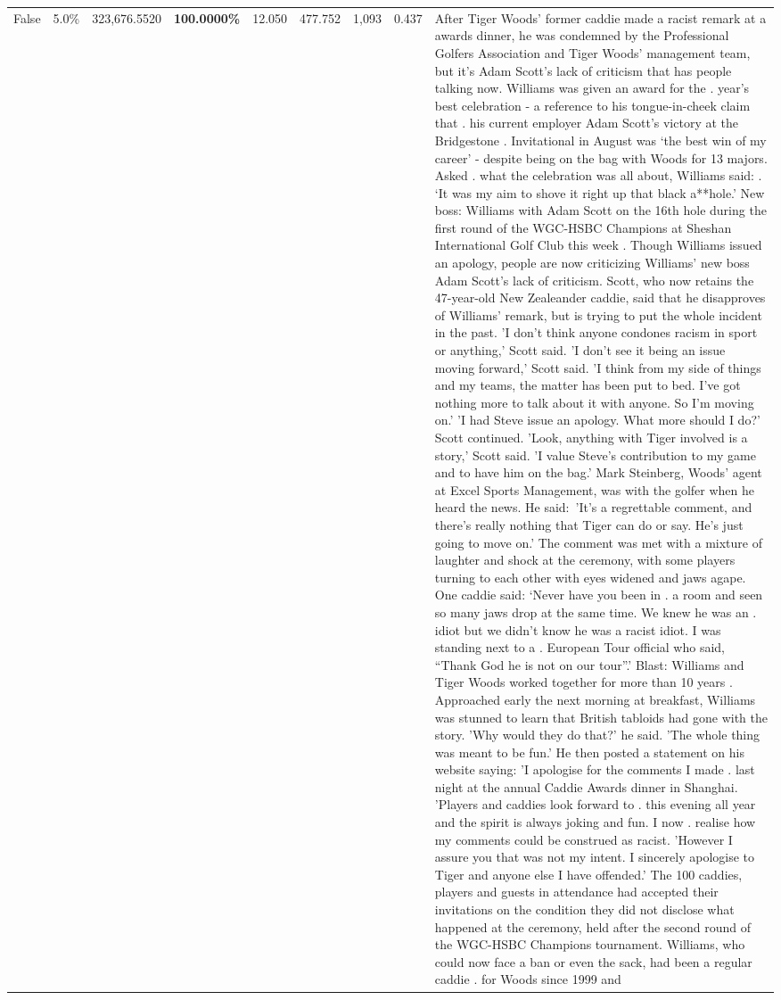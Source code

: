 \begin{table}[H]
\begin{tabular}{lllrlllll}
False & 5.0\% & 323,676.5520 & \bfseries \color{red} 100.0000\% & 12.050 & 477.752 & 1,093 & 0.437 & After Tiger Woods' former caddie made a racist remark at a awards dinner, he was condemned by the Professional Golfers Association and Tiger Woods' management team, but it's Adam Scott's lack of criticism that has people talking now. Williams was given an award for the . year’s best celebration - a reference to his tongue-in-cheek claim that . his current employer Adam Scott’s victory at the Bridgestone . Invitational in August was ‘the best win of my career’ - despite being on the bag with Woods for 13 majors. Asked . what the celebration was all about, Williams said: . ‘It was my aim to shove it right up that black a**hole.’ New boss: Williams with Adam Scott  on the 16th hole during the first round of the WGC-HSBC Champions at Sheshan International Golf Club this week . Though Williams issued an apology, people are now criticizing Williams' new boss Adam Scott's lack of criticism. Scott, who now retains the 47-year-old New Zealeander caddie, said that he disapproves of Williams' remark, but is trying to put the whole incident in the past. 'I don't think anyone condones racism in sport or anything,' Scott said. 'I don't see it being an issue moving forward,' Scott said. 'I think from my side of things and my teams, the matter has been put to bed. I've got nothing more to talk about it with anyone. So I'm moving on.' 'I had Steve issue an apology. What more should I do?' Scott continued. 'Look, anything with Tiger involved is a story,' Scott said. 'I value Steve's contribution to my game and to have him on the bag.' Mark Steinberg, Woods' agent at Excel Sports Management, was with the golfer when he heard the news. He said: 'It's a regrettable comment, and there's really nothing that Tiger can do or say. He's just going to move on.' The comment was met with a mixture of laughter and shock at the ceremony, with some players turning to each other with eyes widened and jaws agape. One caddie said: ‘Never have you been in . a room and seen so many jaws drop at the same time. We knew he was an . idiot but we didn’t know he was a racist idiot. I was standing next to a . European Tour official who said, “Thank God he is not on our tour”.’ Blast: Williams and Tiger Woods worked together for more than 10 years . Approached early the next morning at breakfast, Williams was stunned to learn that British tabloids had gone with the story. 'Why would they do that?' he said. 'The whole thing was meant to be fun.' He then posted a statement on his website saying: 'I apologise for the comments I made . last night at the annual Caddie Awards dinner in Shanghai. 'Players and caddies look forward to . this evening all year and the spirit is always joking and fun. I now . realise how my comments could be construed as racist. 'However I assure you that was not my intent. I sincerely apologise to Tiger and anyone else I have offended.' The 100 caddies, players and guests in attendance had accepted their invitations on the condition they did not disclose what happened at the ceremony, held after the second round of the WGC-HSBC Champions tournament. Williams, who could now face a ban or even the sack, had been a regular caddie . for Woods since 1999 and 
\end{tabular}
\end{table}
